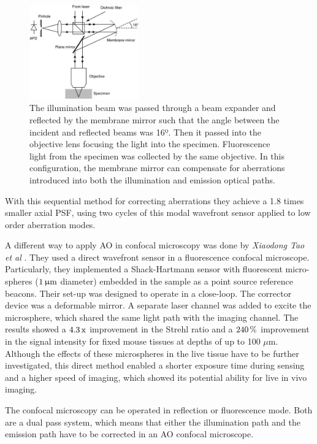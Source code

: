 \begin{figure}[htbp]
	\centering
		\includegraphics[width=0.42\textwidth,height=0.22\textheight]{images/AOM_scan_CFM.jpg}
		\caption{The illumination beam was passed through a beam expander and reflected by the membrane mirror such that the angle between the incident and reflected beams was 16º. Then it passed into the objective lens focusing the light into the specimen. Fluorescence light from the specimen was collected by the same objective. In this configuration, the membrane mirror can compensate for aberrations introduced into both the illumination and emission optical paths.}
	\label{fig:AOM_scan_CFM}
\end{figure}
  
With this sequential method for correcting aberrations they achieve a 1.8 times smaller axial PSF, using two cycles of this modal wavefront sensor applied to low order aberration modes.

A different way to apply AO in confocal microscopy was done by \textit{Xiaodong Tao et al} \cite{scan_Confocal_direct_sensing}. They used a direct wavefront sensor in a fluorescence confocal microscope. Particularly, they implemented a Shack-Hartmann sensor with fluorescent micro-spheres ($\unit[1]{\upmu m}$ diameter) embedded in the sample as a point source reference beacons. Their set-up was designed to operate in a close-loop. The corrector device was a deformable mirror. A separate laser channel was added to excite the microsphere, which shared the same light path with the imaging channel. The results showed a $\unit[4.3]{\text{x}}$ improvement in the Strehl ratio and a $\unit[240]{\%}$ improvement in the signal intensity for fixed mouse tissues at depths of up to 100 $\mu$m. Although the effects of these microspheres in the live tissue have to be further investigated, this direct method enabled a shorter exposure time during sensing and a higher speed of imaging, which showed its potential ability for live in vivo imaging.

The confocal microscopy can be operated in reflection or fluorescence mode. Both are a dual pass system, which means that either the illumination path and the emission path have to be corrected in an AO confocal microscope. 


